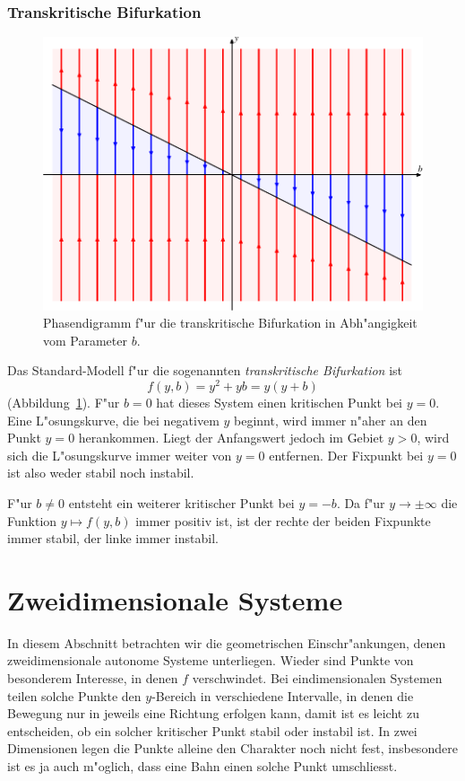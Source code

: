 \subsubsection{Transkritische Bifurkation}
\begin{figure}
\centering
\includegraphics[width=\hsize]{chapters/images/bifurkation-3.pdf}
\caption{Phasendigramm f"ur die transkritische Bifurkation in Abh"angigkeit
vom Parameter $b$.
\label{geometrie:transkritisch}}
\end{figure}
Das Standard-Modell f"ur die sogenannten {\em transkritische Bifurkation} ist 
%
%
\[
f(y,b)=y^2+yb = y(y+b)
\]
(Abbildung~\ref{geometrie:transkritisch}).
F"ur $b=0$ hat dieses System einen kritischen Punkt bei $y=0$.
Eine L"osungskurve, die bei negativem $y$ beginnt, wird immer n"aher
an den Punkt $y=0$ herankommen.
Liegt der Anfangswert jedoch im Gebiet $y>0$, wird sich die L"osungskurve
immer weiter von $y=0$ entfernen.
Der Fixpunkt bei $y=0$ ist also weder stabil noch instabil.

F"ur $b\ne 0$ entsteht ein weiterer kritischer Punkt bei $y=-b$.
Da f"ur $y\to\pm\infty$ die Funktion $y\mapsto f(y,b)$ immer positiv
ist, ist der rechte der beiden Fixpunkte immer stabil, der
linke immer instabil.


%
%
\section{Zweidimensionale Systeme}
%
%
In diesem Abschnitt betrachten wir die geometrischen Einschr"ankungen, denen
zweidimensionale autonome Systeme unterliegen.
Wieder sind Punkte von besonderem Interesse, in denen $f$ verschwindet.
Bei eindimensionalen Systemen teilen solche Punkte den $y$-Bereich in
verschiedene Intervalle, in denen die Bewegung nur in jeweils
eine Richtung erfolgen kann, damit ist es leicht zu entscheiden,
ob ein solcher kritischer Punkt stabil oder instabil ist.
In zwei Dimensionen legen die Punkte alleine den Charakter noch nicht
fest, insbesondere ist es ja auch m"oglich, dass eine Bahn einen solche
Punkt umschliesst.

